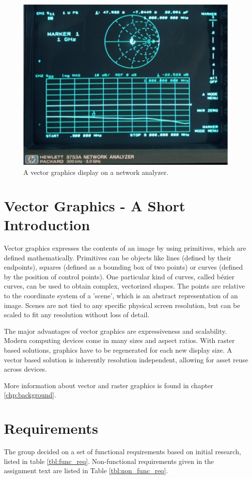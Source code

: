\begin{figure}[h!]
    \centering
    \includegraphics[width=0.6\linewidth]{images/network-analyzer-vector-graphics-display.png}
    \caption{A vector graphics display on a network analyzer\cite{assignment-text}.}
    \label{fig:vector-display-network-analyzer}
\end{figure}

\section{Vector Graphics - A Short Introduction}
Vector graphics expresses the contents of an image by using primitives, which are defined mathematically.
Primitives can be objects like lines (defined by their endpoints), squares (defined as a bounding box of two points) or curves (defined by the position of control points).
One particular kind of curves, called bézier curves, can be used to obtain complex, vectorized shapes.
The points are relative to the coordinate system of a 'scene', which is an abstract representation of an image.
Scenes are not tied to any specific physical screen resolution, but can be scaled to fit any resolution without loss of detail.

The major advantages of vector graphics are expressiveness and scalability.
Modern computing devices come in many sizes and aspect ratios.
With raster based solutions, graphics have to be regenerated for each new display size.
A vector based solution is inherently resolution independent, allowing for asset reuse across devices.

More information about vector and raster graphics is found in chapter \ref{chp:background}.

\section{Requirements}
\label{sec:requirements}
The group decided on a set of functional requirements based on initial research, listed in table \ref{tbl:func_req}.
Non-functional requirements given in the assignment text are listed in Table \ref{tbl:non_func_req}.

